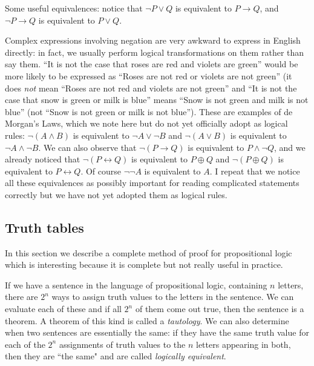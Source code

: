 \documentclass[12pt]{article}
\begin{document}
Some useful equivalences: notice that $\neg P \vee Q$ is equivalent to
$P \rightarrow Q$, and $\neg P \rightarrow Q$ is equivalent to $P \vee
Q$.

Complex expressions involving negation are very awkward to express in
English directly: in fact, we usually perform logical transformations
on them rather than say them.  ``It is not the case that roses are red
and violets are green'' would be more likely to be expressed as
``Roses are not red or violets are not green'' (it does {\em not\/}
mean ``Roses are not red and violets are not green'' and ``It is not
the case that snow is green or milk is blue'' means ``Snow is not
green and milk is not blue'' (not ``Snow is not green or milk is not
blue'').  These are examples of de Morgan's Laws, which we note here
but do not yet officially adopt as logical rules: $\neg(A \wedge B)$
is equivalent to $\neg A \vee \neg B$ and $\neg(A \vee B)$ is
equivalent to $\neg A \wedge \neg B$.  We can also observe that
$\neg(P \rightarrow Q)$ is equivalent to $P \wedge \neg Q$, and we
already noticed that $\neg(P \leftrightarrow Q)$ is equivalent to $P
\oplus Q$ and $\neg(P \oplus Q)$ is equivalent to $P \leftrightarrow
Q$.  Of course $\neg\neg A$ is equivalent to $A$.  I repeat that we
notice all these equivalences as possibly important for reading
complicated statements correctly but we have not yet adopted them as
logical rules.

\subsection{Truth tables}

In this section we describe a complete method of proof for propositional logic which is interesting because it is complete but not really useful in practice.

If we have a sentence in the language of propositional logic, containing $n$ letters, there are $2^n$ ways to assign truth values
to the letters in the sentence.  We can evaluate each of these and if all $2^n$ of them come out true, then the sentence is a theorem.
A theorem of this kind is called a {\em tautology\/}.  We can also determine when two sentences are essentially the same:  if they
have the same truth value for each of the $2^n$ assignments of truth values to the $n$ letters appearing in both, then they are ``the same"
and are called {\em logically equivalent\/}.
\end{document}
